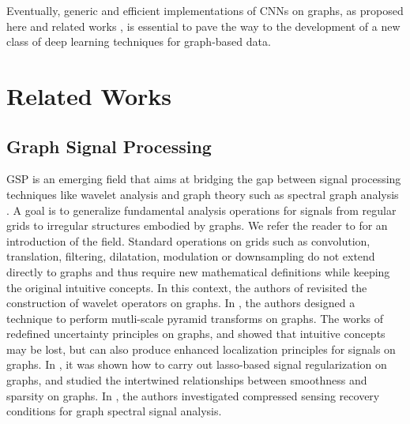 \documentclass{article}
\begin{document}
\noindent
Eventually, generic and efficient implementations of CNNs on
graphs, as proposed here and related works \cite{pro:GregorLeCun10LRF,pro:CoatesNg11LRF,pro:MasciBoscainiBronsteinVandergheynst15GeoDL,
art:MasciBoscainiBronsteinVandergheynst15ShapeNet,art:BrunaZarembaSzlamLeCun13DLgraphs,art:HenaffBrunaLeCun15DLgraphs}, is essential to pave the way to the development of a new class of deep learning techniques for graph-based data.






\section{Related Works}
\subsection{Graph Signal Processing} GSP is an emerging field that aims at
bridging the gap between signal processing techniques like wavelet analysis \cite{book:Mallat99wavelets} and
graph theory such as spectral graph analysis
\cite{art:BelkinNiyogi05LaplaBeltrami, art:VonLuxburg07Tutorial}. A goal is to
generalize fundamental analysis operations for signals from regular grids to
irregular structures embodied by graphs. We refer the reader to
\cite{art:ShumanNarangFrossardOrtegaVandergheynst13ReviewSPG}
 for an
introduction of the field. Standard operations on grids such as convolution,
translation, filtering, dilatation, modulation or downsampling do not extend
directly to graphs and thus require new mathematical definitions while keeping
the original intuitive concepts. In this context, the authors of
\cite{art:HammondVandergheynstGribonval11GraphWav, art:CoifmanLafon06DifMap,
pro:GavishNadlerCoifman10GraphHaar} revisited the construction of wavelet
operators on graphs. In \cite{art:ShumanFarajiVandergheynst16PyramTrans,
art:RamEladCohen11TreeWavelets}, the authors designed a technique to perform
mutli-scale pyramid transforms on graphs. The works of
\cite{pro:TsitsveroBarbarossa15Uncert, pro:PasdeloupAlamiGriponRabbat15Uncert,
art:PerraudinRicaudShumanVandergheynst16Uncert} redefined uncertainty principles
on graphs, and showed that intuitive concepts may be lost, but can also produce
enhanced localization principles for signals on graphs. In
\cite{pro:HammondRaoaroorJacquesVandergheynst10LassoGraWav}, it was shown how to
carry out lasso-based signal regularization on graphs, and studied the
intertwined relationships between smoothness and sparsity on graphs. In
\cite{pro:TremblayPuyGribonvalVandergheynst16CompSpecClus}, the authors
investigated compressed sensing recovery conditions for graph spectral signal
analysis.
\end{document}

